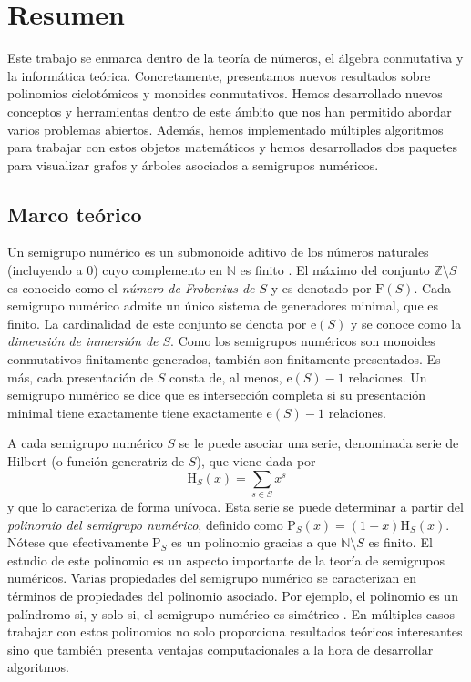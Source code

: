 \chapter*{Resumen}

Este trabajo se enmarca dentro de la teoría de números, el álgebra conmutativa y la informática teórica. Concretamente, presentamos nuevos resultados sobre polinomios ciclotómicos y monoides conmutativos. Hemos desarrollado nuevos conceptos y herramientas dentro de este ámbito que nos han permitido abordar varios problemas abiertos. Además, hemos implementado múltiples algoritmos para trabajar con estos objetos matemáticos y hemos desarrollados dos paquetes para visualizar grafos y árboles asociados a semigrupos numéricos.

\section*{Marco teórico}

Un semigrupo numérico es un submonoide aditivo de los números naturales (incluyendo a $0$) cuyo complemento en $\mathbb{N}$ es finito \cite[Capítulo 1]{ns}. El máximo del conjunto $\mathbb{Z} \setminus S$ es conocido como el \emph{número de Frobenius de $S$} y es denotado por $\mathrm{F}(S)$. Cada semigrupo numérico admite un único sistema de generadores minimal, que es finito. La cardinalidad de este conjunto se denota por $\mathrm{e}(S)$ y se conoce como la \emph{dimensión de inmersión de $S$}. Como los semigrupos numéricos son monoides conmutativos finitamente generados, también son finitamente presentados. Es más, cada presentación de $S$ consta de, al menos, $\mathrm{e}(S)-1$ relaciones. Un semigrupo numérico se dice que es intersección completa si su presentación minimal tiene exactamente tiene exactamente $\mathrm{e}(S) - 1$ relaciones.

A cada semigrupo numérico $S$ se le puede asociar una serie, denominada serie de Hilbert (o función generatriz de $S$), que viene dada por
\[\mathrm{H}_S(x) = \sum_{s \in S}x^s\]
y que lo caracteriza de forma unívoca. Esta serie se puede determinar a partir del \emph{polinomio del semigrupo numérico}, definido como $\mathrm{P}_S(x) = (1-x)\mathrm{H}_S(x)$. Nótese que efectivamente $\mathrm{P}_S$ es un polinomio gracias a que $\mathbb{N} \setminus S$ es finito. El estudio de este polinomio es un aspecto importante de la teoría de semigrupos numéricos. Varias propiedades del semigrupo numérico se caracterizan en términos de propiedades del polinomio asociado. Por ejemplo, el polinomio es un palíndromo si, y solo si, el semigrupo numérico es simétrico \cite{ns:cyclo-bernoulli}. En múltiples casos trabajar con estos polinomios no solo proporciona resultados teóricos interesantes sino que también presenta ventajas computacionales a la hora de desarrollar algoritmos.

